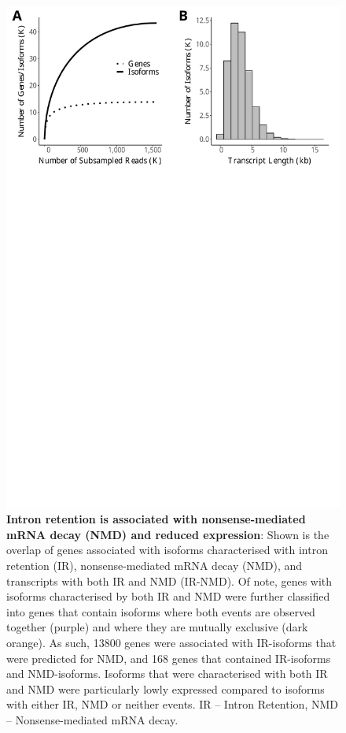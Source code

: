\begin{figure}[htp]
	\begin{center}
		\includegraphics[page=9,trim={0 1cm 0 0.5cm},clip,scale = 0.55]{Figures/IsoSeqWholeTranscriptome.pdf}
	\end{center}
	\captionsetup{width=0.95\textwidth}
	\caption[Association of intron retention and NMD in Whole Transcriptome Iso-Seq]%
	{\textbf{Intron retention is associated with nonsense-mediated mRNA decay (NMD) and reduced expression}: Shown is the overlap of genes associated with isoforms characterised with intron retention (IR), nonsense-mediated mRNA decay (NMD), and transcripts with both IR and NMD (IR-NMD). Of note, genes with isoforms characterised by both IR and NMD were further classified into genes that contain isoforms where both events are observed together (purple) and where they are mutually exclusive (dark orange). As such, 13800 genes were associated with IR-isoforms that were predicted for NMD, and 168 genes that contained IR-isoforms and NMD-isoforms. Isoforms that were characterised with both IR and NMD were particularly lowly expressed compared to isoforms with either IR, NMD or neither events. IR – Intron Retention, NMD – Nonsense-mediated mRNA decay.}
	\label{fig:isoseq_whole_IRNMD}
\end{figure}

